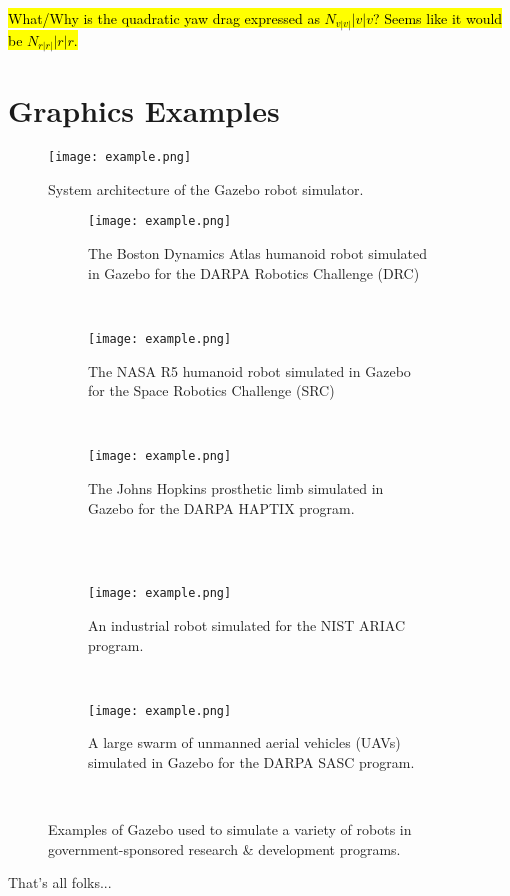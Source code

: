 \documentclass[11pt,draftcls,journal,onecolumn]{../latexlib/latex_ieee/IEEEtran}
\begin{document}
\hl{What/Why is the quadratic yaw drag expressed as $N_{v|v|}|v|v$?  Seems like it would be $N_{r|r|}|r|r$.}


\section{Graphics Examples}

\begin{figure}[h]
  \centering
  \texttt{[image: example.png]}
  \caption{System architecture of the Gazebo robot simulator.}
  \label{fig:gazebo-arch}
\end{figure}



\begin{figure}[h]
  \centering
  \begin{subfigure}[t]{0.3\textwidth}
    \texttt{[image: example.png]}
    \caption{The Boston Dynamics Atlas humanoid robot simulated in Gazebo for
             the DARPA Robotics Challenge (DRC)}
  \end{subfigure}
  ~
  \begin{subfigure}[t]{0.3\textwidth}
    \texttt{[image: example.png]}
    \caption{The NASA R5 humanoid robot simulated in Gazebo for the Space
             Robotics Challenge (SRC)}
  \end{subfigure}
  ~
  \begin{subfigure}[t]{0.3\textwidth}
    \texttt{[image: example.png]}
    \caption{The Johns Hopkins prosthetic limb simulated in Gazebo for the
             DARPA HAPTIX program.}
  \end{subfigure}\\
  ~
  \begin{subfigure}[t]{0.3\textwidth}
    \texttt{[image: example.png]}
    \caption{An industrial robot simulated for the NIST ARIAC program.}
  \end{subfigure}
  ~
  \begin{subfigure}[t]{0.3\textwidth}
    \texttt{[image: example.png]}
    \caption{A large swarm of unmanned aerial vehicles (UAVs) simulated in
             Gazebo for the DARPA SASC program.}
  \end{subfigure}
  ~
  \caption{Examples of Gazebo used to simulate a variety of robots in
           government-sponsored research \& development programs.}
  \label{fig:gazebo_examples}
\end{figure}

\clearpage

That's all folks...


%

%


\end{document}
